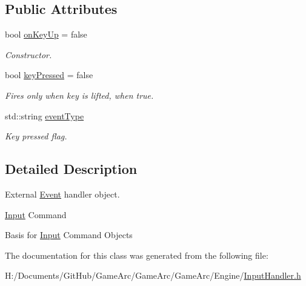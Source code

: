 \subsection*{Public Attributes}
\begin{DoxyCompactItemize}
\item 
\hypertarget{class_input_command_a099c658ec29f0ec0cd3c30535c76b4a9}{bool \hyperlink{class_input_command_a099c658ec29f0ec0cd3c30535c76b4a9}{on\+Key\+Up} = false}\label{class_input_command_a099c658ec29f0ec0cd3c30535c76b4a9}

\begin{DoxyCompactList}\small\item\em Constructor. \end{DoxyCompactList}\item 
\hypertarget{class_input_command_a64175f320e19197d623586f24a0cf2c1}{bool \hyperlink{class_input_command_a64175f320e19197d623586f24a0cf2c1}{key\+Pressed} = false}\label{class_input_command_a64175f320e19197d623586f24a0cf2c1}

\begin{DoxyCompactList}\small\item\em Fires only when key is lifted, when true. \end{DoxyCompactList}\item 
\hypertarget{class_input_command_a0b2bfae63bec459ea0df48dc0fc8ec36}{std\+::string \hyperlink{class_input_command_a0b2bfae63bec459ea0df48dc0fc8ec36}{event\+Type}}\label{class_input_command_a0b2bfae63bec459ea0df48dc0fc8ec36}

\begin{DoxyCompactList}\small\item\em Key pressed flag. \end{DoxyCompactList}\end{DoxyCompactItemize}


\subsection{Detailed Description}
External \hyperlink{class_event}{Event} handler object. 

\hyperlink{class_input}{Input} Command

Basis for \hyperlink{class_input}{Input} Command Objects 

The documentation for this class was generated from the following file\+:\begin{DoxyCompactItemize}
\item 
H\+:/\+Documents/\+Git\+Hub/\+Game\+Arc/\+Game\+Arc/\+Game\+Arc/\+Engine/\hyperlink{_input_handler_8h}{Input\+Handler.\+h}\end{DoxyCompactItemize}
